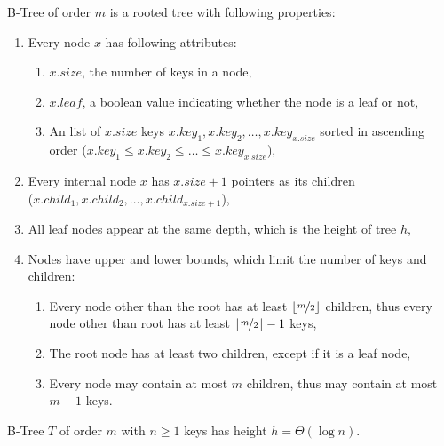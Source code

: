 \begin{definition}\label{def:btree}
  B-Tree of order $m$ is a rooted tree with following properties:
  \begin{enumerate}
    \item Every node $x$ has following attributes:
          \begin{enumerate}
            \item $x.size$, the number of keys in a node,
            \item $x.leaf$, a boolean value indicating whether the node is a leaf or not,
            \item An list of $x.size$ keys $x.key_1, x.key_2, \dots, x.key_{x.size}$ sorted in ascending order ($x.key_1 \le x.key_2 \le \dots \le x.key_{x.size}$),
          \end{enumerate}
    \item Every internal node $x$ has $x.size + 1$ pointers as its children \\($x.child_1, x.child_2, \dots, x.child_{x.size + 1}$),
    \item All leaf nodes appear at the same depth, which is the height of tree $h$,
    \item Nodes have upper and lower bounds, which limit the number of keys and children:
          \begin{enumerate}
            \item Every node other than the root has at least $\lfloor\nicefrac{m}{2}\rfloor$ children, thus every node other than root has at least $\lfloor\nicefrac{m}{2}\rfloor - 1$ keys,
            \item The root node has at least two children, except if it is a leaf node,
            \item Every node may contain at most $m$ children, thus may contain at most $m - 1$ keys.
          \end{enumerate}
  \end{enumerate}
\end{definition}

\begin{lemma}
  B-Tree $T$ of order $m$ with $n \ge 1$ keys has height $h = \Theta(\log{n})$.
\end{lemma}

